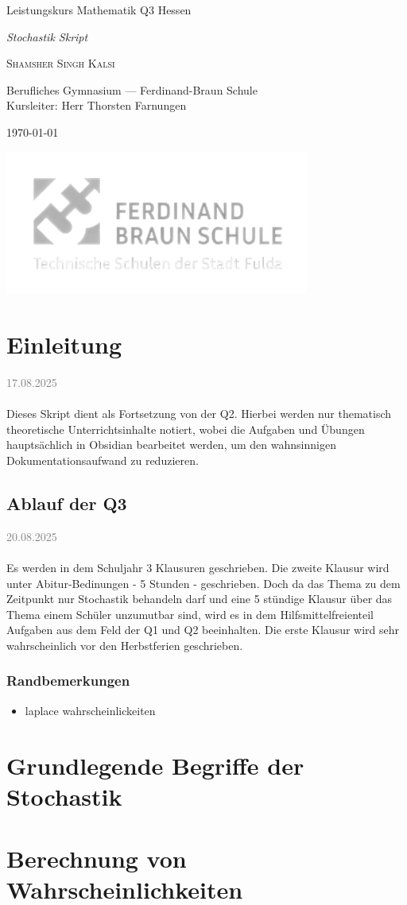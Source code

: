 \documentclass[11pt,a4paper,oneside]{article}
\newcommand{\lessondate}[1]{
	\noindent\hfill\textcolor{gray}{\textsc{#1}} \\
	\vspace{0.5cm}
}
\newcommand{\MakeArtTitle}[4]{%
	\begin{titlepage}
		\vspace*{18mm}
		\begin{center}
			\vspace{12mm}
			{\huge\color{TextCream} #1 \par}
			\vspace{6mm}
			{\Large\itshape\color{AccentBlue!50} #2 \par}
			\vspace{10mm}
			{\Large\scshape\color{TextCream} #3 \par}
			\vspace{6mm}
			{\small\color{MarginalGray} #4 \par}
			\vspace{5mm}
			{\small\color{MarginalGray} \today \par}
		\end{center}
		\vspace{7.5cm}
		\centering
		\includegraphics[width=0.75\textwidth]{2.png} %
	\end{titlepage}
}
\begin{document}
	
	\MakeArtTitle{
		Leistungskurs Mathematik Q3 Hessen}
		{Stochastik Skript}
		{Shamsher Singh Kalsi}
		{Berufliches Gymnasium — Ferdinand-Braun Schule \\ Kursleiter: Herr Thorsten Farnungen}
	
	\tableofcontents
	\bigskip
	\clearpage
	
	
	\section{Einleitung}
	\lessondate{17.08.2025}\\
	Dieses Skript dient als Fortsetzung von der Q2. Hierbei werden nur thematisch theoretische Unterrichtsinhalte notiert, wobei die Aufgaben und Übungen hauptsächlich in Obsidian bearbeitet werden, um den wahnsinnigen Dokumentationsaufwand zu reduzieren. 
	
	\subsection{Ablauf der Q3}
	\lessondate{20.08.2025}\\
	Es werden in dem Schuljahr 3 Klausuren geschrieben. Die zweite Klausur wird unter Abitur-Bedinungen - 5 Stunden - geschrieben. Doch da das Thema zu dem Zeitpunkt nur Stochastik behandeln darf und eine 5 stündige Klausur über das Thema einem Schüler unzumutbar sind, wird es in dem Hilfsmittelfreienteil Aufgaben aus dem Feld der Q1 und Q2 beeinhalten. Die erste Klausur wird sehr wahrscheinlich vor den Herbstferien geschrieben.
	
	\subsubsection{Randbemerkungen}
	\begin{itemize}
		\item laplace wahrscheinlickeiten 
	\end{itemize}
	
	
	
	\section{Grundlegende Begriffe der Stochastik}
	
	
	
	\section{Berechnung von Wahrscheinlichkeiten}
	
\end{document}
